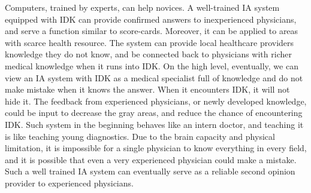 \documentclass[11pt]{pnas-new}
\begin{document}
\begin{itemize}
Computers, trained by experts, can help novices. {\color{blue}A well-trained IA system equipped with IDK can provide confirmed answers to inexperienced physicians, and} serve a function
similar to score-cards{\color{blue}. Moreover, it can be applied to areas with scarce health resource. The system can provide local healthcare providers knowledge they do not know, and be connected back to physicians with richer medical knowledge when it runs into IDK.
On the high level, eventually, we can view an IA system with IDK as a medical specialist full of knowledge and do not make mistake when it knows the answer. When it encounters IDK, it will not hide it. The feedback from experienced physicians, or newly developed knowledge, could be input to decrease the gray areas, and reduce the chance of encountering IDK. Such system in the beginning behaves like an intern doctor, and teaching it is like}
teaching young diagnostics. {\color{blue}Due to the brain capacity and physical limitation, it is impossible for a single physician to know everything in every field, and it is possible that even a very experienced physician could make a mistake. Such a well trained IA system can eventually serve as a reliable second opinion provider to experienced physicians.}
\end{itemize}

% 

\end{document}
